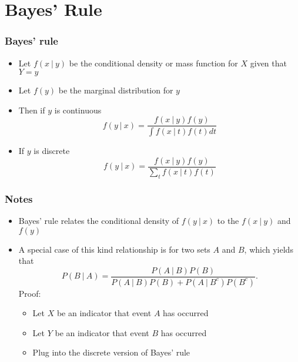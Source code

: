 \documentclass[aspectratio=169]{beamer}
\begin{document}

\section{Bayes' Rule}
\begin{frame}\frametitle{Bayes' rule}
\begin{itemize}
\item Let $f(x ~|~ y)$ be the conditional density or mass function for $X$ given
  that $Y = y$
\item Let $f(y)$ be the marginal distribution for $y$
\item Then if $y$ is continuous
  $$
  f(y ~|~ x) = \frac{f(x ~|~ y) f(y)}{\int f(x ~|~ t) f(t) dt}
  $$
\item If $y$ is discrete
  $$
  f(y ~|~ x) = \frac{f(x ~|~ y) f(y)}{\sum_t f(x ~|~ t) f(t)}  
  $$
\end{itemize}
\end{frame}

\begin{frame}\frametitle{Notes}
\begin{itemize}
\item Bayes' rule relates the conditional density of $f(y ~|~ x)$ to
  the $f(x ~|~ y)$ and $f(y)$
\item A special case of this kind relationship is for two sets $A$ and $B$, 
  which yields that
  $$
  P(B ~|~ A) = \frac{P(A ~|~ B) P(B)}{P(A ~|~ B) P(B) + P(A ~|~ B^c)P(B^c)}.
  $$
Proof:
\begin{itemize}
\item Let $X$ be an indicator that event $A$ has occurred
\item Let $Y$ be an indicator that event $B$ has occurred
\item Plug into the discrete version of Bayes' rule
\end{itemize}
\end{itemize}
\end{frame}
\end{document}
